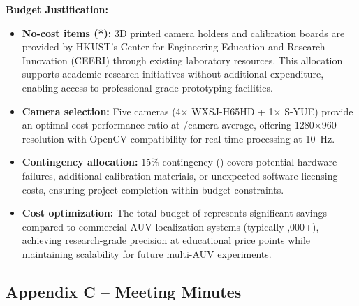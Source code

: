 \documentclass[11pt]{article}
\begin{document}
        \textbf{Budget Justification:}
        \begin{itemize}
            \item \textbf{No-cost items (*):} 3D printed camera holders and calibration boards are provided by HKUST's Center for Engineering Education and Research Innovation (CEERI) through existing laboratory resources. This allocation supports academic research initiatives without additional expenditure, enabling access to professional-grade prototyping facilities.
            \item \textbf{Camera selection:} Five cameras (4$\times$ WXSJ-H65HD + 1$\times$ S-YUE) provide an optimal cost-performance ratio at /camera average, offering 1280$\times$960 resolution with OpenCV compatibility for real-time processing at 10~Hz.
            \item \textbf{Contingency allocation:} 15\% contingency () covers potential hardware failures, additional calibration materials, or unexpected software licensing costs, ensuring project completion within budget constraints.
            \item \textbf{Cost optimization:} The total budget of  represents significant savings compared to commercial AUV localization systems (typically ,000+), achieving research-grade precision at educational price points while maintaining scalability for future multi-AUV experiments.
        \end{itemize}
    \newpage
    \subsection*{Appendix C -- Meeting Minutes}
\end{document}
